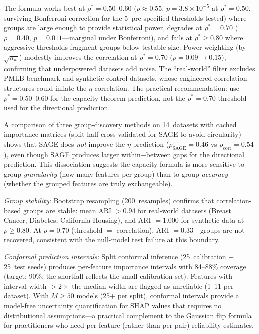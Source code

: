 \documentclass[11pt,a4paper]{article}
\begin{document}
The formula works best at $\rho^* = 0.50$--$0.60$ ($\rho \approx 0.55$, $p = 3.8 \times 10^{-5}$ at $\rho^* = 0.50$, surviving Bonferroni correction for the 5~pre-specified thresholds tested) where groups are large enough to provide statistical power, degrades at $\rho^* = 0.70$ ($\rho = 0.40$, $p = 0.011$---marginal under Bonferroni), and fails at $\rho^* \geq 0.80$ where aggressive thresholds fragment groups below testable size.  Power weighting (by $\sqrt{n_w}$) modestly improves the correlation at $\rho^* = 0.70$ ($\rho = 0.09 \to 0.15$), confirming that underpowered datasets add noise.  The ``real-world'' filter excludes PMLB benchmark and synthetic control datasets, whose engineered correlation structures could inflate the $\eta$ correlation.  The practical recommendation: use $\rho^* = 0.50$--$0.60$ for the capacity theorem prediction, not the $\rho^* = 0.70$ threshold used for the directional prediction.

A comparison of three group-discovery methods on 14~datasets with cached importance matrices (split-half cross-validated for SAGE to avoid circularity) shows that SAGE does \emph{not} improve the $\eta$ prediction ($\rho_{\text{SAGE}} = 0.46$ vs $\rho_{\text{corr}} = 0.54$), even though SAGE produces larger within$-$between gaps for the directional prediction.  This dissociation suggests the capacity formula is more sensitive to group \emph{granularity} (how many features per group) than to group \emph{accuracy} (whether the grouped features are truly exchangeable).

\emph{Group stability:} Bootstrap resampling (200~resamples) confirms that correlation-based groups are stable: mean ARI $> 0.94$ for real-world datasets (Breast Cancer, Diabetes, California Housing), and ARI $= 1.000$ for synthetic data at $\rho \geq 0.80$.  At $\rho = 0.70$ (threshold $=$ correlation), ARI $= 0.33$---groups are not recovered, consistent with the null-model test failure at this boundary.

\emph{Conformal prediction intervals:}  Split conformal inference (25~calibration $+$ 25~test seeds) produces per-feature importance intervals with 84--88\% coverage (target: 90\%; the shortfall reflects the small calibration set).  Features with interval width $> 2\times$ the median width are flagged as unreliable (1--11 per dataset).  With $M \geq 50$ models (25+ per split), conformal intervals provide a model-free uncertainty quantification for SHAP values that requires no distributional assumptions---a practical complement to the Gaussian flip formula for practitioners who need per-feature (rather than per-pair) reliability estimates.
\end{document}
